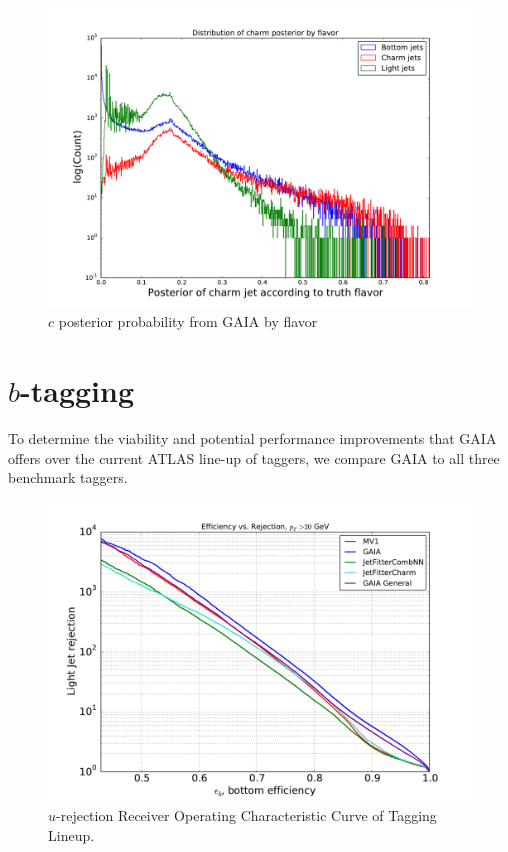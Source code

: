\begin{figure}[h]
\includegraphics[width=\textwidth]{figures/charm_p_distro}
\caption[The ATLAS detector]{$c$ posterior probability from GAIA by flavor
\label{fig:cpost}}
\end{figure}



\section{$b$-tagging} 
\label{sec:btag}

To determine the viability and potential performance improvements that GAIA offers over the current ATLAS line-up of taggers, we compare GAIA to all three benchmark taggers.



\begin{figure}[h]
\includegraphics[width=\textwidth]{figures/btag/u_rej_ROC.pdf}
\caption[The ATLAS detector]{$u$-rejection Receiver Operating Characteristic Curve of Tagging Lineup.
\label{fig:urejROC}}
\end{figure}

